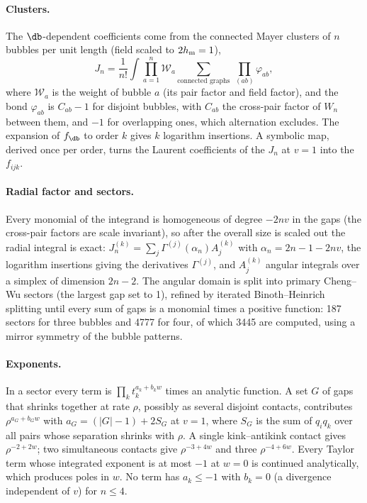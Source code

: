 \paragraph{Clusters.} The $\db$-dependent coefficients come from the connected Mayer clusters of $n$ bubbles per unit
length (field scaled to $2h_{\rm m}=1$),
\begin{equation}
 J_n=\frac1{n!}\int\prod_{a=1}^n\mathcal W_a\sum_{\text{connected graphs}}\ \prod_{(ab)}\varphi_{ab},
\end{equation}
where $\mathcal W_a$ is the weight of bubble $a$ (its pair factor and field factor), and the bond $\varphi_{ab}$ is
$C_{ab}-1$ for disjoint bubbles, with $C_{ab}$ the cross-pair factor of $W_n$ between them, and $-1$ for overlapping
ones, which alternation excludes. The expansion of $f_{\db}$ to order $k$ gives $k$ logarithm insertions. A symbolic
map, derived once per order, turns the Laurent coefficients of the $J_n$ at $v=1$ into the $f_{ijk}$.

\paragraph{Radial factor and sectors.} Every monomial of the integrand is homogeneous of degree $-2nv$ in the gaps (the
cross-pair factors are scale invariant), so after the overall size is scaled out the radial integral is exact:
$J_n^{(k)}=\sum_j\Gamma^{(j)}(\alpha_n)A_j^{(k)}$ with $\alpha_n=2n-1-2nv$, the logarithm insertions giving the
derivatives $\Gamma^{(j)}$, and $A_j^{(k)}$ angular integrals over a simplex of dimension $2n-2$. The angular domain is
split into primary Cheng--Wu sectors (the largest gap set to 1), refined by iterated Binoth--Heinrich splitting until
every sum of gaps is a monomial times a positive function: 187 sectors for three bubbles and 4777 for four, of which
3445 are computed, using a mirror symmetry of the bubble patterns.

\paragraph{Exponents.} In a sector every term is $\prod_kt_k^{a_k+b_kw}$ times an analytic function. A set $G$ of
gaps that shrinks together at rate $\rho$, possibly as several disjoint contacts, contributes
$\rho^{a_G+b_Gw}$ with $a_G=(|G|-1)+2S_G$ at $v=1$, where $S_G$ is the sum of $q_iq_k$ over all pairs whose separation
shrinks with $\rho$. A single kink--antikink contact gives $\rho^{-2+2w}$; two simultaneous contacts give
$\rho^{-3+4w}$ and three $\rho^{-4+6w}$. Every Taylor term whose integrated exponent is at most $-1$ at $w=0$ is
continued analytically, which produces poles in $w$. No term has $a_k\le-1$ with $b_k=0$ (a divergence independent of
$v$) for $n\le4$.

